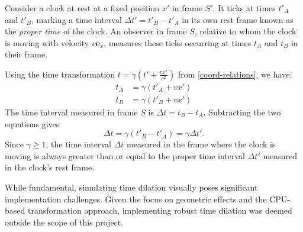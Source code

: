 \documentclass[a4paper]{article}
\begin{document}
Consider a clock at rest at a fixed position $x'$ in frame $S'$. It ticks at times $t'_A$ and $t'_B$, marking a time interval $\Delta t' = t'_B - t'_A$ in its own rest frame known as the \textit{proper time} of the clock. An observer in frame $S$, relative to whom the clock is moving with velocity $v \mathbf{e}_x$, measures these ticks occurring at times $t_A$ and $t_B$ in their frame.

Using the time transformation $t = \gamma(t' + \frac{vx'}{c^2})$ from \eqref{coord-relations}, we have:
\begin{align*}
    t_A &= \gamma(t'_A + vx') \\
    t_B &= \gamma(t'_B + vx')
\end{align*}
The time interval measured in frame $S$ is $\Delta t = t_B - t_A$. Subtracting the two equations gives
\begin{equation} \label{time-dilation}
    \Delta t = \gamma (t'_B - t'_A) = \gamma \Delta t'.
\end{equation}
Since $\gamma \ge 1$, the time interval $\Delta t$ measured in the frame where the clock is moving is always greater than or equal to the proper time interval $\Delta t'$ measured in the clock's rest frame. 


 
While fundamental, simulating time dilation visually poses significant implementation challenges. Given the focus on geometric effects and the CPU-based transformation approach, implementing robust time dilation was deemed outside the scope of this project.

\end{document}
